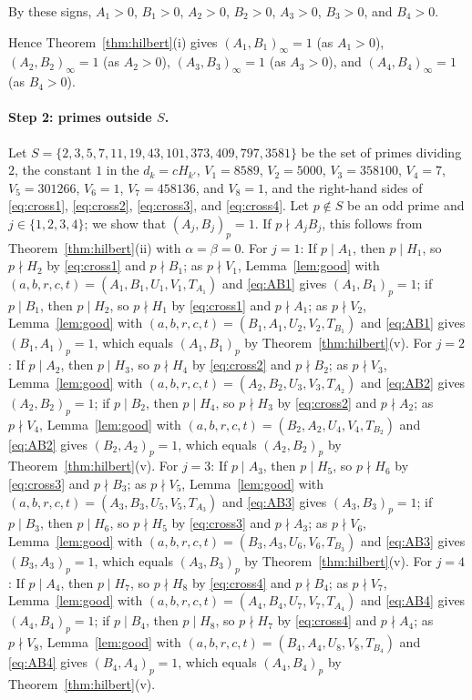 \documentclass[11pt]{article}
\begin{document}
By these signs, $A_{1}>0$, $B_{1}>0$, $A_{2}>0$, $B_{2}>0$, $A_{3}>0$, $B_{3}>0$, and $B_{4}>0$.

Hence Theorem~\ref{thm:hilbert}(i) gives $(A_{1},B_{1})_\infty=1$ (as $A_{1}>0$), $(A_{2},B_{2})_\infty=1$ (as $A_{2}>0$), $(A_{3},B_{3})_\infty=1$ (as $A_{3}>0$), and $(A_{4},B_{4})_\infty=1$ (as $B_{4}>0$).

\paragraph{Step 2: primes outside $S$.} Let $S=\{2,3,5,7,11,19,43,101,373,409,797,3581\}$ be the set of primes dividing $2$, the constant $1$ in the $d_k=cH_{k'}$, $V_{1}=8589$, $V_{2}=5000$, $V_{3}=358100$, $V_{4}=7$, $V_{5}=301266$, $V_{6}=1$, $V_{7}=458136$, and $V_{8}=1$, and the right-hand sides of \eqref{eq:cross1}, \eqref{eq:cross2}, \eqref{eq:cross3}, and \eqref{eq:cross4}. Let $p\notin S$ be an odd prime and $j\in\{1,2,3,4\}$; we show that $(A_j,B_j)_p=1$. If $p\nmid A_jB_j$, this follows from Theorem~\ref{thm:hilbert}(ii) with $\alpha=\beta=0$. For $j=1$: If $p\mid A_{1}$, then $p\mid H_{1}$, so $p\nmid H_{2}$ by \eqref{eq:cross1} and $p\nmid B_{1}$; as $p\nmid V_{1}$, Lemma~\ref{lem:good} with $(a,b,r,c,t)=(A_{1},B_{1},U_{1},V_{1},T_{A_{1}})$ and \eqref{eq:AB1} gives $(A_{1},B_{1})_p=1$; if $p\mid B_{1}$, then $p\mid H_{2}$, so $p\nmid H_{1}$ by \eqref{eq:cross1} and $p\nmid A_{1}$; as $p\nmid V_{2}$, Lemma~\ref{lem:good} with $(a,b,r,c,t)=(B_{1},A_{1},U_{2},V_{2},T_{B_{1}})$ and \eqref{eq:AB1} gives $(B_{1},A_{1})_p=1$, which equals $(A_{1},B_{1})_p$ by Theorem~\ref{thm:hilbert}(v). For $j=2$: If $p\mid A_{2}$, then $p\mid H_{3}$, so $p\nmid H_{4}$ by \eqref{eq:cross2} and $p\nmid B_{2}$; as $p\nmid V_{3}$, Lemma~\ref{lem:good} with $(a,b,r,c,t)=(A_{2},B_{2},U_{3},V_{3},T_{A_{2}})$ and \eqref{eq:AB2} gives $(A_{2},B_{2})_p=1$; if $p\mid B_{2}$, then $p\mid H_{4}$, so $p\nmid H_{3}$ by \eqref{eq:cross2} and $p\nmid A_{2}$; as $p\nmid V_{4}$, Lemma~\ref{lem:good} with $(a,b,r,c,t)=(B_{2},A_{2},U_{4},V_{4},T_{B_{2}})$ and \eqref{eq:AB2} gives $(B_{2},A_{2})_p=1$, which equals $(A_{2},B_{2})_p$ by Theorem~\ref{thm:hilbert}(v). For $j=3$: If $p\mid A_{3}$, then $p\mid H_{5}$, so $p\nmid H_{6}$ by \eqref{eq:cross3} and $p\nmid B_{3}$; as $p\nmid V_{5}$, Lemma~\ref{lem:good} with $(a,b,r,c,t)=(A_{3},B_{3},U_{5},V_{5},T_{A_{3}})$ and \eqref{eq:AB3} gives $(A_{3},B_{3})_p=1$; if $p\mid B_{3}$, then $p\mid H_{6}$, so $p\nmid H_{5}$ by \eqref{eq:cross3} and $p\nmid A_{3}$; as $p\nmid V_{6}$, Lemma~\ref{lem:good} with $(a,b,r,c,t)=(B_{3},A_{3},U_{6},V_{6},T_{B_{3}})$ and \eqref{eq:AB3} gives $(B_{3},A_{3})_p=1$, which equals $(A_{3},B_{3})_p$ by Theorem~\ref{thm:hilbert}(v). For $j=4$: If $p\mid A_{4}$, then $p\mid H_{7}$, so $p\nmid H_{8}$ by \eqref{eq:cross4} and $p\nmid B_{4}$; as $p\nmid V_{7}$, Lemma~\ref{lem:good} with $(a,b,r,c,t)=(A_{4},B_{4},U_{7},V_{7},T_{A_{4}})$ and \eqref{eq:AB4} gives $(A_{4},B_{4})_p=1$; if $p\mid B_{4}$, then $p\mid H_{8}$, so $p\nmid H_{7}$ by \eqref{eq:cross4} and $p\nmid A_{4}$; as $p\nmid V_{8}$, Lemma~\ref{lem:good} with $(a,b,r,c,t)=(B_{4},A_{4},U_{8},V_{8},T_{B_{4}})$ and \eqref{eq:AB4} gives $(B_{4},A_{4})_p=1$, which equals $(A_{4},B_{4})_p$ by Theorem~\ref{thm:hilbert}(v).
\end{document}
